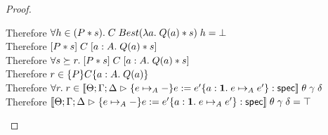 \begin{proof}
\begin{tabbedproof}
    \ooooo Therefore $\forall h \in (P * s).\; C\;Best(\lambda a.\;Q(a) * s)\;h = \bot$ \\
    \ooooo Therefore $[{P * s}]\;{C}\;[{a:A}.\;{Q(a) * s}]$ \\
    \oooo Therefore $\forall s \succeq r.\; [{P * s}]\;{C}\;[{a:A}.\;{Q(a) * s}]$ \\
    \oooo Therefore $r \in \{{P}\}{C}\{{a:A}.\;{Q(a)}\}$ \\
    \ooo Therefore $\forall r.\; r \in [\![{{\Theta; \Gamma; \Delta} \vartriangleright {\{{e \mapsto_A -}\}{e := e'}\{{a:\mathbf{1}}.\;{e \mapsto_A e'}\}} : \mathsf{spec}}]\!]\;\theta\;\gamma\;\delta$ \\
    \ooo Therefore $[\![{{\Theta; \Gamma; \Delta} \vartriangleright {\{{e \mapsto_A -}\}{e := e'}\{{a:\mathbf{1}}.\;{e \mapsto_A e'}\}} : \mathsf{spec}}]\!]\;\theta\;\gamma\;\delta = \top$ \\
  \end{tabbedproof}
\end{proof}



